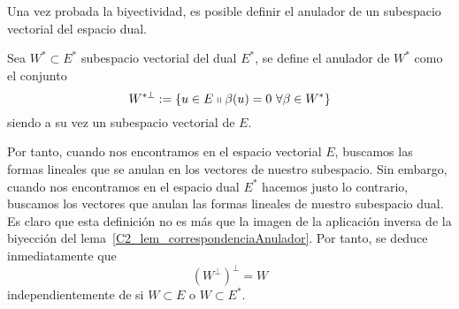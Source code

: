 Una vez probada la biyectividad, es posible definir el anulador de un subespacio vectorial del espacio dual.
\begin{defi}
	\label{C2_def_anuladorDual}
	Sea $W^*\subset E^*$ subespacio vectorial del dual $E^*$, se define el anulador de $W^*$ como el conjunto
	\begin{equation}
	W^{*\perp}:=\{u\in E\shortparallel \beta(u)=0 \ \forall \beta\in W^*\}
	\end{equation}
	siendo a su vez un subespacio vectorial de $E$.
\end{defi}
Por tanto, cuando nos encontramos en el espacio vectorial $E$, buscamos las formas lineales que se anulan en los vectores de nuestro subespacio. Sin embargo, cuando nos encontramos en el espacio dual $E^*$ hacemos justo lo contrario, buscamos los vectores que anulan las formas lineales de nuestro subespacio dual. Es claro que esta definición no es más que la imagen de la aplicación inversa de la biyección del lema~\ref{C2_lem_correspondenciaAnulador}. Por tanto, se deduce inmediatamente que 
\begin{equation}
	(W^{\perp})^{\perp}=W
\end{equation}
independientemente de si $W\subset E$ o $W\subset E^*$.

